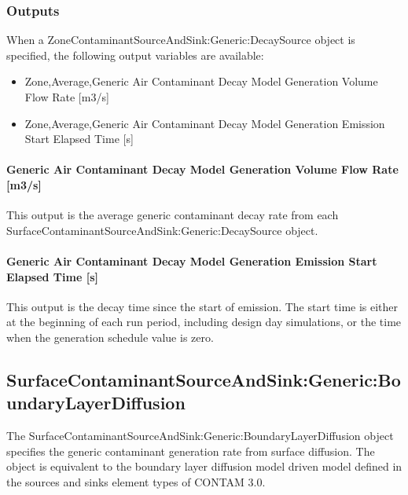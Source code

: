 \subsubsection{Outputs}\label{outputs-10-003}

When a ZoneContaminantSourceAndSink:Generic:DecaySource object is specified, the following output variables are available:

\begin{itemize}
    \tightlist
  \item
    Zone,Average,Generic Air Contaminant Decay Model Generation Volume Flow Rate {[}m3/s{]}
  \item
    Zone,Average,Generic Air Contaminant Decay Model Generation Emission Start Elapsed Time {[}s{]}
\end{itemize}

\paragraph{Generic Air Contaminant Decay Model Generation Volume Flow Rate {[}m3/s{]}}\label{generic-air-contaminant-decay-model-generation-volume-flow-rate-m3s}

This output is the average generic contaminant decay rate from each Surface\-Contaminant\-Source\-And\-Sink:\-Generic:\-Decay\-Source object.

\paragraph{Generic Air Contaminant Decay Model Generation Emission Start Elapsed Time {[}s{]}}\label{generic-air-contaminant-decay-model-generation-emission-start-elapsed-time-s}

This output is the decay time since the start of emission. The start time is either at the beginning of each run period, including design day simulations, or the time when the generation schedule value is zero.

\subsection{Surface\-Contaminant\-Source\-And\-Sink:\-Generic:\-Boundary\-Layer\-Diffusion}\label{surfacecontaminantsourceandsinkgenericboundarylayerdiffusion}

The Surface\-Contaminant\-Source\-And\-Sink:\-Generic:\-Boundary\-Layer\-Diffusion object specifies the generic contaminant generation rate from surface diffusion. The object is equivalent to the boundary layer diffusion model driven model defined in the sources and sinks element types of CONTAM 3.0.


